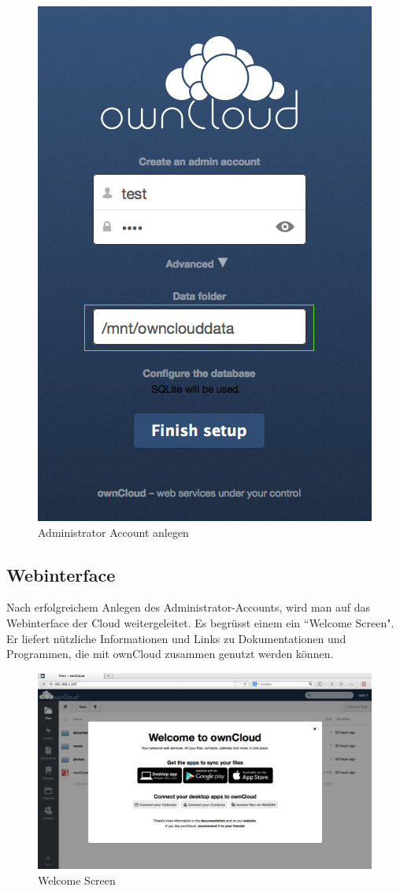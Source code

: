 \begin{figure}[h]
\centering
\includegraphics[scale=0.5]{images/admin_setup}
\caption{Administrator Account anlegen}
\end{figure}

\subsection{Webinterface}
Nach erfolgreichem Anlegen des Administrator-Accounts, wird man auf das Webinterface der Cloud weitergeleitet. Es begrüsst einem ein ``Welcome Screen". Er liefert nützliche Informationen und Links zu Dokumentationen und Programmen, die mit ownCloud zusammen genutzt werden können. 

\begin{figure}[h]
\centering
\includegraphics[scale=0.4]{images/welcomescreen}
\caption{Welcome Screen}
\end{figure}


